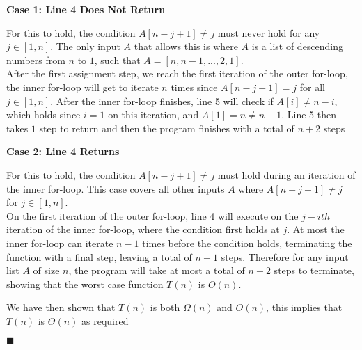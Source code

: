 \documentclass[20pt]{article}
\begin{document}
\noindent
\textbf{Case 1: Line 4 Does Not Return}\\
\begin{text}
    \indent For this to hold, the condition $A[n-j+1] \neq j$ must never hold for any $j \in [1,n]$. The only input $A$ that allows this is where $A$ is a list of descending numbers from $n$ to $1$, such that $A = [n, n-1, ..., 2, 1]$.\\
    \noindent
    \indent After the first assignment step, we reach the first iteration of the outer for-loop, the inner for-loop will get to iterate $n$ times since $A[n-j+1] = j$ for all $j \in [1,n]$. After the inner for-loop finishes, line 5 will check if $A[i] \neq n - i$, which holds since $i = 1$ on this iteration, and $A[1] = n \neq n-1$. Line 5 then takes $1$ step to return and then the program finishes with a total of $n+2$ steps\\
\end{text}

\noindent
\textbf{Case 2: Line 4 Returns}\\
\begin{text}
    \indent For this to hold, the condition $A[n-j+1] \neq j$ must hold during an iteration of the inner for-loop. This case covers all other inputs $A$ where $A[n-j+1] \neq j$ for $j \in [1,n]$.\\
    \noindent
    \indent On the first iteration of the outer for-loop, line 4 will execute on the $j-ith$ iteration of the inner for-loop, where the condition first holds at $j$. At most the inner for-loop can iterate $n-1$ times before the condition holds, terminating the function with a final step, leaving a total of $n+1$ steps. Therefore for any input list $A$ of size $n$, the program will take at most a total of $n+2$ steps to terminate, showing that the worst case function $T(n)$ is $O(n)$.\\
\end{text}


\noindent
\begin{text}
    We have then shown that $T(n)$ is both $\Omega(n)$ and $O(n)$, this implies that $T(n)$ is $\Theta(n)$ as required
    
    \hfill$\blacksquare$
\end{text}

\newpage

\end{document}
